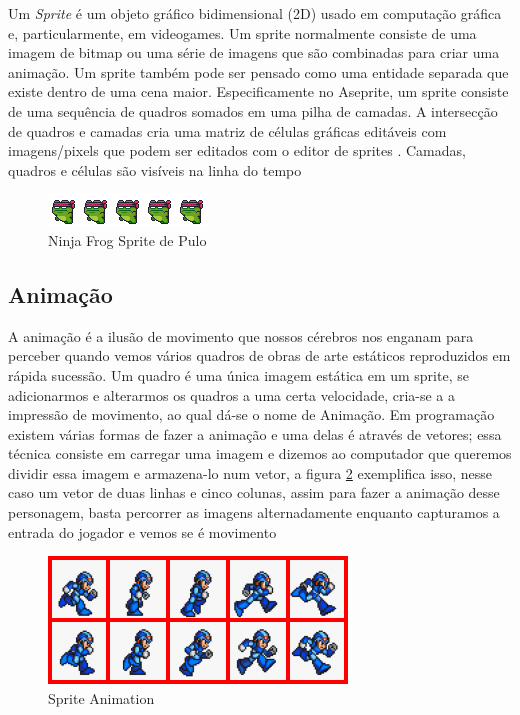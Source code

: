 Um \textit{Sprite} é um objeto gráfico bidimensional (2D) usado em computação gráfica e, particularmente, em videogames. Um sprite normalmente consiste de uma imagem de bitmap ou uma série de imagens que são combinadas para criar uma animação. Um sprite também pode ser pensado como uma entidade separada que existe dentro de uma cena maior. Especificamente no Aseprite, um sprite consiste de uma sequência de quadros somados em uma pilha de camadas. A intersecção de quadros e camadas cria uma matriz de células gráficas editáveis com imagens/pixels que podem ser editados com o editor de sprites . Camadas, quadros e células são visíveis na linha do tempo
\begin{figure}[h!]
    \centering
    \includegraphics[width=1\linewidth]{figuras/sprite-frog.png}
    \caption{Ninja Frog Sprite de Pulo}
    \label{fig:enter-label}
\end{figure}


\subsection{Animação}
\label{sec:animacao}
 A animação é a ilusão de movimento que nossos cérebros nos enganam para perceber quando vemos vários quadros de obras de arte estáticos reproduzidos em rápida sucessão.
Um quadro é uma única imagem estática em um sprite, se adicionarmos e alterarmos os quadros a uma certa velocidade, cria-se a a impressão de movimento, ao qual dá-se o nome de Animação. 
Em programação existem várias formas de fazer a animação e uma delas é através de vetores; essa técnica consiste em carregar uma imagem e dizemos ao computador que queremos dividir essa imagem e armazena-lo num vetor, a figura \ref{fig:sprite-animation} exemplifica isso, nesse caso um vetor de duas linhas e cinco colunas, assim para fazer a animação desse personagem, basta percorrer as imagens alternadamente enquanto capturamos a entrada do jogador e vemos se é movimento

\begin{figure}[h!]
    \centering
    \includegraphics[width=0.8\linewidth]{figuras/megaman-sprite-animation-export.png}
    \caption{Sprite Animation}
    \label{fig:sprite-animation}
\end{figure}







